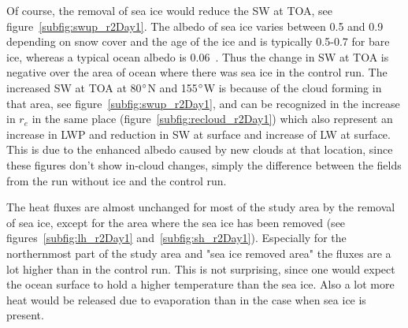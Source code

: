 
Of course, the removal of sea ice would reduce the SW at TOA, see figure~\ref{subfig:swup_r2Day1}. The albedo of sea ice varies between 0.5 and 0.9 depending on snow cover and the age of the ice and is typically 0.5-0.7 for bare ice, whereas a typical ocean albedo is 0.06~\citep{NSIDC}. Thus the change in SW at TOA is negative over the area of ocean where there was sea ice in the control run. The increased SW at TOA at 80$\degree$N and 155$\degree$W is because of the cloud forming in that area, see figure~\ref{subfig:swup_r2Day1}, and can be recognized in the increase in $r_e$ in the same place (figure~\ref{subfig:recloud_r2Day1}) which also represent an increase in LWP and reduction in SW at surface and increase of LW at surface. This is due to the enhanced albedo caused by new clouds at that location, since these figures don't show in-cloud changes, simply the difference between the fields from the run without ice and the control run.

The heat fluxes are almost unchanged for most of the study area by the removal of sea ice, except for the area where the sea ice has been removed (see figures~\ref{subfig:lh_r2Day1} and~\ref{subfig:sh_r2Day1}). Especially for the northernmost part of the study area and "sea ice removed area" the fluxes are a lot higher than in the control run. This is not surprising, since one would expect the ocean surface to hold a higher temperature than the sea ice. Also a lot more heat would be released due to evaporation than in the case when sea ice is present. 

